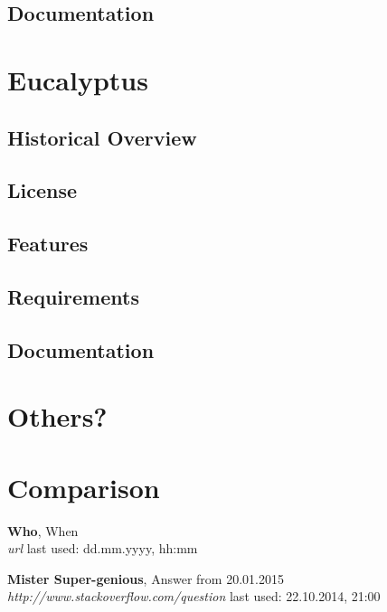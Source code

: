 \documentclass[12pt]{article}
\begin{document}
\subsection{Documentation}
\section{Eucalyptus}
\subsection{Historical Overview}
\subsection{License}
\subsection{Features}
\subsection{Requirements}
\subsection{Documentation}
\section{Others?}
\section{Comparison}



\newpage

\listoftables
\listoffigures
\printglossaries

\begin{thebibliography}{56}

   \textbf{Who}, When\\
  \textit{url}
  \newline last used: dd.mm.yyyy, hh:mm
 
  \textbf{Mister Super-genious}, Answer from 20.01.2015\\
  \textit{http://www.stackoverflow.com/question}
  \newline last used: 22.10.2014, 21:00
\end{thebibliography}
\end{document}
